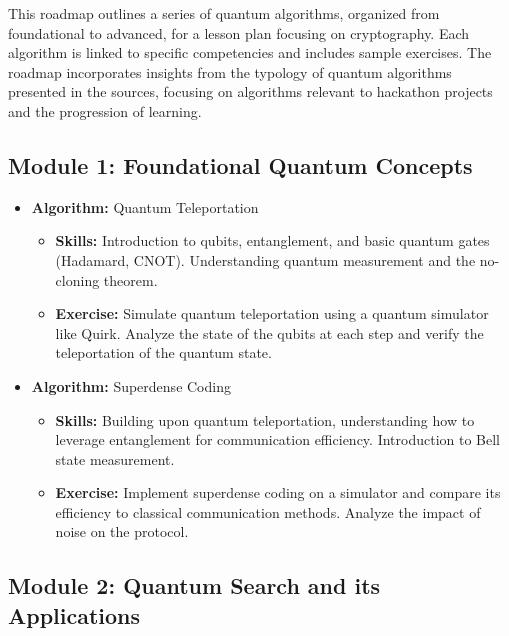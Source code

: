 This roadmap outlines a series of quantum algorithms, organized from foundational to advanced, for a lesson plan focusing on cryptography. Each algorithm is linked to specific competencies and includes sample exercises. The roadmap incorporates insights from the typology of quantum algorithms presented in the sources, focusing on algorithms relevant to hackathon projects and the progression of learning.

\subsection{Module 1: Foundational Quantum Concepts}

\begin{itemize}
    \item \textbf{Algorithm:} Quantum Teleportation
    \begin{itemize}
        \item \textbf{Skills:} Introduction to qubits, entanglement, and basic quantum gates (Hadamard, CNOT). Understanding quantum measurement and the no-cloning theorem.
        \item \textbf{Exercise:} Simulate quantum teleportation using a quantum simulator like Quirk. Analyze the state of the qubits at each step and verify the teleportation of the quantum state.
    \end{itemize}
    
    \item \textbf{Algorithm:} Superdense Coding
    \begin{itemize}
        \item \textbf{Skills:} Building upon quantum teleportation, understanding how to leverage entanglement for communication efficiency. Introduction to Bell state measurement.
        \item \textbf{Exercise:} Implement superdense coding on a simulator and compare its efficiency to classical communication methods. Analyze the impact of noise on the protocol.
    \end{itemize}
\end{itemize}

\subsection{Module 2: Quantum Search and its Applications}

